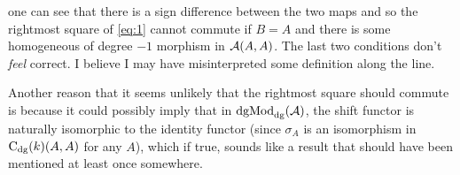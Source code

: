 \documentclass[a4paper, 12pt]{article}
\begin{document}
\begin{center}
\end{center}
one can see that there is a sign difference between the two maps and so the rightmost square of \autoref{eq:1} cannot commute if \( B = A \) and there is some homogeneous of degree \( -1 \) morphism in \( {\mathcal{A}}(A, A) \). The last two conditions don't \emph{feel} correct. I believe I may have misinterpreted some definition along the line.

Another reason that it seems unlikely that the rightmost square should commute is because it could possibly imply that in \( \operatorname{dgMod}_{\operatorname{dg}}({\mathcal{A}}) \), the shift functor is naturally isomorphic to the identity functor (since \( \sigma_A \) is an isomorphism in \( \operatorname{C}_{\operatorname{dg}}(k)(A, A) \) for any \( A \)), which if true, sounds like a result that should have been mentioned at least once somewhere.

{}

\end{document}
